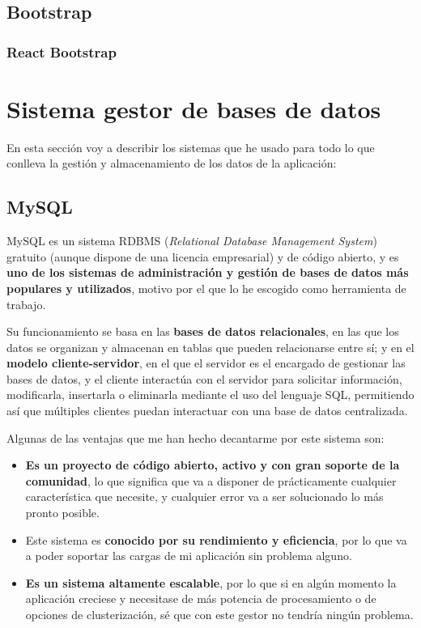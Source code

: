 \subsection{Bootstrap}


\subsubsection{React Bootstrap}



\section{Sistema gestor de bases de datos}

En esta sección voy a describir los sistemas que he usado para todo lo que conlleva la gestión y almacenamiento de los datos de la aplicación:

\subsection{MySQL}

MySQL es un sistema RDBMS (\textit{Relational Database Management System}) gratuito (aunque dispone de una licencia empresarial) y de código abierto, y es \textbf{uno de los sistemas de administración y gestión de bases de datos más populares y utilizados}, motivo por el que lo he escogido como herramienta de trabajo.

Su funcionamiento se basa en las \textbf{bases de datos relacionales}, en las que los datos se organizan y almacenan en tablas que pueden relacionarse entre sí; y en el \textbf{modelo cliente-servidor}, en el que el servidor es el encargado de gestionar las bases de datos, y el cliente interactúa con el servidor para solicitar información, modificarla, insertarla o eliminarla mediante el uso del lenguaje SQL, permitiendo así que múltiples clientes puedan interactuar con una base de datos centralizada. \cite{wikipedia:mysql}

Algunas de las ventajas que me han hecho decantarme por este sistema son:

\begin{itemize}
  \item \textbf{Es un proyecto de código abierto, activo y con gran soporte de la comunidad}, lo que significa que va a disponer de prácticamente cualquier característica que necesite, y cualquier error va a ser solucionado lo más pronto posible.
  \item Este sistema es \textbf{conocido por su rendimiento y eficiencia}, por lo que va a poder soportar las cargas de mi aplicación sin problema alguno.
  \item \textbf{Es un sistema altamente escalable}, por lo que si en algún momento la aplicación creciese y necesitase de más potencia de procesamiento o de opciones de clusterización, sé que con este gestor no tendría ningún problema.
\end{itemize}


